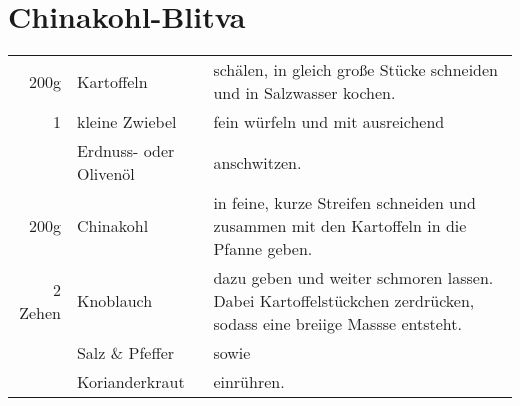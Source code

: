 \section{Chinakohl-Blitva}
\unverified
\begin{longtable}{rlL{15.36cm}}
    200g    &   Kartoffeln              &   schälen, in gleich große Stücke schneiden und  in Salzwasser kochen.\\
    1       &   kleine Zwiebel          &   fein würfeln und mit ausreichend\\
            &   Erdnuss- oder Olivenöl  &   anschwitzen.\\
    200g    &   Chinakohl               &   in feine, kurze Streifen schneiden und zusammen mit den Kartoffeln in die Pfanne geben.\\
    2 Zehen &   Knoblauch               &   dazu geben und weiter schmoren lassen.
                                            Dabei Kartoffelstückchen zerdrücken, sodass eine breiige Massse entsteht.\\
            &   Salz \& Pfeffer         &   sowie\\
            &   Korianderkraut          &   einrühren.\\
\end{longtable}
